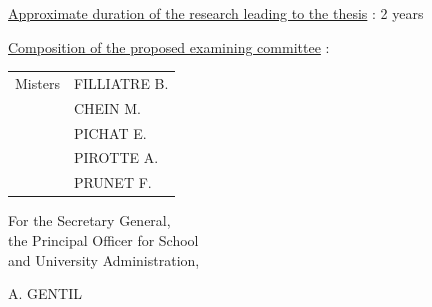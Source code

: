 \uline{Approximate duration of the research leading to the thesis} : 2 years

\uline{Composition of the proposed examining committee} :

\begin{tabular}{ll}
Misters & FILLIATRE B.\\
& CHEIN M.\\
& PICHAT E.\\
& PIROTTE A.\\
& PRUNET F.
\end{tabular}

\begin{center}
For the Secretary General,\\
the Principal Officer for School\\
and University Administration,


A. GENTIL
\end{center}

